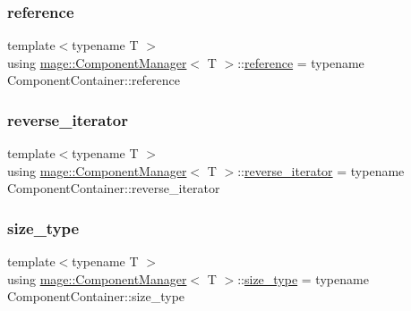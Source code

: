 \mbox{\label{classmage_1_1_component_manager_a4daeb292f527534c155e359faf7eaf80}} 
\subsubsection{\texorpdfstring{reference}{reference}}
{\footnotesize\ttfamily template$<$typename T $>$ \\
using \mbox{\hyperlink{classmage_1_1_component_manager}{mage\+::\+Component\+Manager}}$<$ T $>$\+::\mbox{\hyperlink{classmage_1_1_component_manager_a4daeb292f527534c155e359faf7eaf80}{reference}} =  typename Component\+Container\+::reference}

\mbox{\label{classmage_1_1_component_manager_a33e3e4994e4ec77e3ab587d68dbb8277}} 
\subsubsection{\texorpdfstring{reverse\+\_\+iterator}{reverse\_iterator}}
{\footnotesize\ttfamily template$<$typename T $>$ \\
using \mbox{\hyperlink{classmage_1_1_component_manager}{mage\+::\+Component\+Manager}}$<$ T $>$\+::\mbox{\hyperlink{classmage_1_1_component_manager_a33e3e4994e4ec77e3ab587d68dbb8277}{reverse\+\_\+iterator}} =  typename Component\+Container\+::reverse\+\_\+iterator}

\mbox{\label{classmage_1_1_component_manager_a6bd219525db9ec9f3adb9259e52674da}} 
\subsubsection{\texorpdfstring{size\+\_\+type}{size\_type}}
{\footnotesize\ttfamily template$<$typename T $>$ \\
using \mbox{\hyperlink{classmage_1_1_component_manager}{mage\+::\+Component\+Manager}}$<$ T $>$\+::\mbox{\hyperlink{classmage_1_1_component_manager_a6bd219525db9ec9f3adb9259e52674da}{size\+\_\+type}} =  typename Component\+Container\+::size\+\_\+type}

